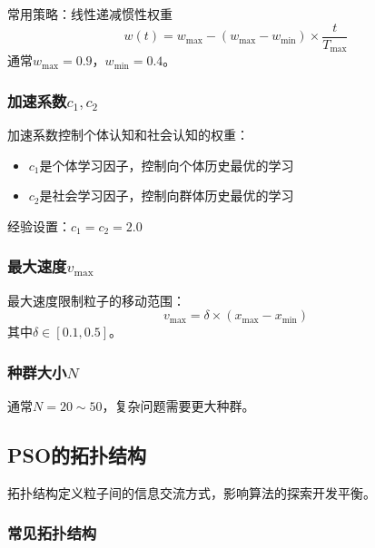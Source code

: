 常用策略：线性递减惯性权重
\[
w(t) = w_{\max} - (w_{\max} - w_{\min}) \times \frac{t}{T_{\max}}
\]
通常$w_{\max} = 0.9$，$w_{\min} = 0.4$。

\subsubsection{加速系数$c_1, c_2$}

加速系数控制个体认知和社会认知的权重：
\begin{itemize}
    \item $c_1$是个体学习因子，控制向个体历史最优的学习
    \item $c_2$是社会学习因子，控制向群体历史最优的学习
\end{itemize}

经验设置：$c_1 = c_2 = 2.0$

\subsubsection{最大速度$v_{\max}$}

最大速度限制粒子的移动范围：
\[
v_{\max} = \delta \times (x_{\max} - x_{\min})
\]
其中$\delta \in [0.1, 0.5]$。

\subsubsection{种群大小$N$}

通常$N = 20 \sim 50$，复杂问题需要更大种群。

\subsection{PSO的拓扑结构}

拓扑结构定义粒子间的信息交流方式，影响算法的探索开发平衡。

\subsubsection{常见拓扑结构}

